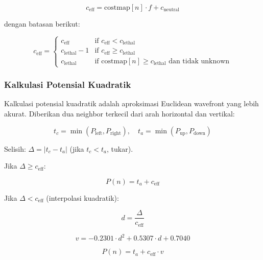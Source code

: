 \begin{equation}
c_{\text{eff}} = \text{costmap}[n] \cdot f + c_{\text{neutral}}
\end{equation}

dengan batasan berikut:

\begin{equation}
c_{\text{eff}} = \begin{cases}
c_{\text{eff}} & \text{if } c_{\text{eff}} < c_{\text{lethal}} \\
c_{\text{lethal}} - 1 & \text{if } c_{\text{eff}} \geq c_{\text{lethal}} \\
c_{\text{lethal}} & \text{if } \text{costmap}[n] \geq c_{\text{lethal}}
\text{ dan tidak unknown}
\end{cases}
\end{equation}



\subsubsection{Kalkulasi Potensial Kuadratik}

Kalkulasi potensial kuadratik adalah aproksimasi Euclidean wavefront
yang lebih akurat. Diberikan dua neighbor terkecil dari arah horizontal
dan vertikal:

\begin{equation}
t_c = \min(P_{\text{left}}, P_{\text{right}}), \quad
t_a = \min(P_{\text{up}}, P_{\text{down}})
\end{equation}

Selisih: $\Delta = |t_c - t_a|$ (jika $t_c < t_a$, tukar).

Jika $\Delta \geq c_{\text{eff}}$:

\begin{equation}
P(n) = t_a + c_{\text{eff}}
\end{equation}

Jika $\Delta < c_{\text{eff}}$ (interpolasi kuadratik):

\begin{equation}
d = \frac{\Delta}{c_{\text{eff}}}
\end{equation}

\begin{equation}
v = -0.2301 \cdot d^2 + 0.5307 \cdot d + 0.7040
\end{equation}

\begin{equation}
P(n) = t_a + c_{\text{eff}} \cdot v
\end{equation}


